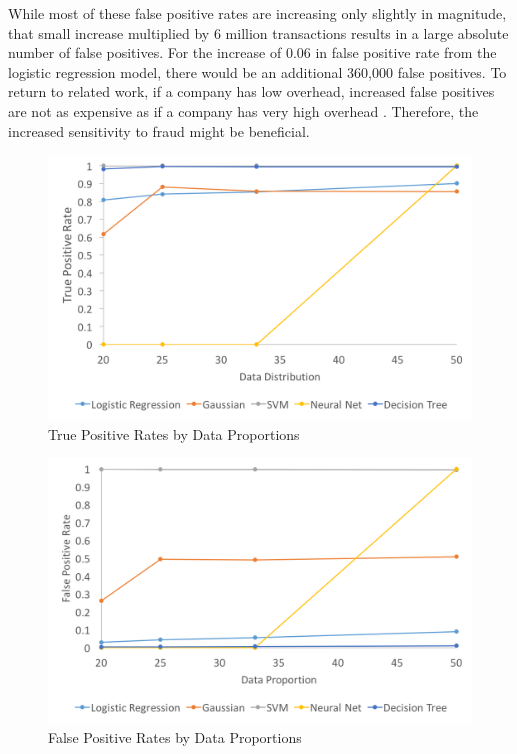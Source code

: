 \documentclass[midd]{thesis}
\begin{document}
While most of these false positive rates are increasing only slightly in magnitude, that small increase multiplied by 6 million transactions results in a large absolute number of false positives. For the increase of 0.06 in false positive rate from the logistic regression model, there would be an additional 360,000 false positives. To return to related work, if a company has low overhead, increased false positives are not as expensive as if a company has very high overhead \cite{Chan}. Therefore, the increased sensitivity to fraud might be beneficial. 

\begin{figure} \centering
  \includegraphics[scale=.7]{tpr.png}
  \caption{True Positive Rates by Data Proportions}
  \label{fig:tpr}
\end{figure}

\begin{figure} \centering
  \includegraphics[scale=.7]{fpr.png}
  \caption{False Positive Rates by Data Proportions}
  \label{fig:fpr}
\end{figure}
\end{document}
